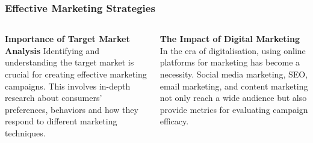 \documentclass[5pt]{beamer}
\begin{document}
\begin{frame}
\frametitle{Effective Marketing Strategies}
\begin{columns}
\begin{column}{0.45\textwidth}
\begin{block}{\textbf{Importance of Target Market Analysis}}
Identifying and understanding the target market is crucial for creating effective marketing campaigns. This involves in-depth research about consumers' preferences, behaviors and how they respond to different marketing techniques.
\end{block}
\end{column}
\begin{column}{0.45\textwidth}
\begin{block}{\textbf{The Impact of Digital Marketing}}
In the era of digitalisation, using online platforms for marketing has become a necessity. Social media marketing, SEO, email marketing, and content marketing not only reach a wide audience but also provide metrics for evaluating campaign efficacy.
\end{block}
\end{column}
\end{columns}
\end{frame}
\end{document}
